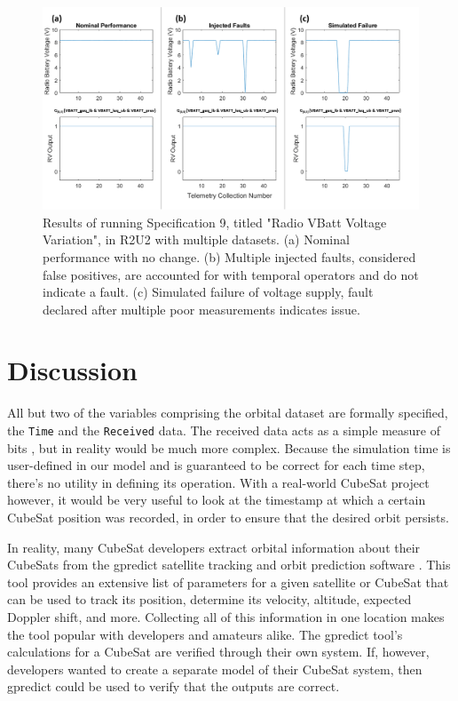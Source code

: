 \documentclass[conf]{new-aiaa}
\begin{document}
\begin{figure}[!ht]
\centering
\includegraphics[width=.8\textwidth]{Fig/VBATT_Spec9.png}
\caption{Results of running Specification 9, titled "Radio VBatt Voltage Variation", in R2U2 with multiple datasets. (a) Nominal performance with no change. (b) Multiple injected faults, considered false positives, are accounted for with temporal operators and do not indicate a fault. (c) Simulated failure of voltage supply, fault declared after multiple poor measurements indicates issue.}
\label{VBATTSpecResults}
\end{figure}

\section{Discussion}

All but two of the variables comprising the orbital dataset are formally specified, the \texttt{Time} and the \texttt{Received} data. The received data acts as a simple measure of bits%
, but in reality would be much more complex. Because the simulation time is user-defined in our model and is guaranteed to be correct for each time step, there's no utility in defining its operation. With a real-world CubeSat project however, it would be very useful to look at the timestamp at which a certain CubeSat position was recorded, in order to ensure that the desired orbit persists.

In reality, many CubeSat developers extract orbital information about their CubeSats from the gpredict satellite tracking and orbit prediction software \cite{csete2018}. This tool provides an extensive list of parameters for a given satellite or CubeSat that can be used to track its position, determine its velocity, altitude, expected Doppler shift, and more. Collecting all of this information in one location makes the tool popular with developers and amateurs alike. The gpredict tool's calculations for a CubeSat are verified through their own system. If, however, developers wanted to create a separate model of their CubeSat system, then gpredict could be used to verify that the outputs are correct.
\end{document}
